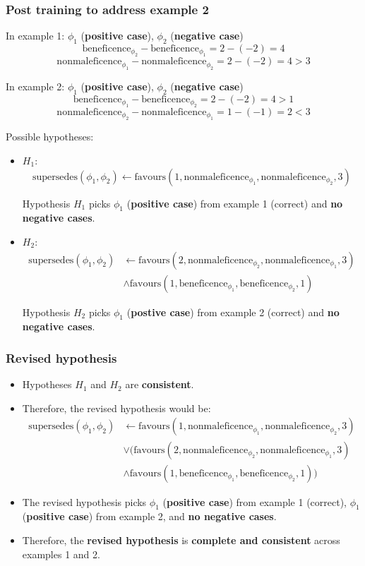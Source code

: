 \documentclass[11pt]{article}
\begin{document}
\subsubsection{Post training to address example 2}
\label{sec:orga0d6601}
In example 1:
\(\phi_1\) (\textbf{positive case}), \(\phi_2\) (\textbf{negative case})
\[\text{beneficence}_{\phi_2} - \text{beneficence}_{\phi_1} = 2 - (-2) = 4\]
\[\text{nonmaleficence}_{\phi_1} - \text{nonmaleficence}_{\phi_2} = 2 - (-2) = 4 > 3\]

In example 2:
\(\phi_1\) (\textbf{positive case}), \(\phi_2\) (\textbf{negative case})
\[\text{beneficence}_{\phi_1} - \text{beneficence}_{\phi_2} = 2 - (-2) = 4 > 1\]
\[\text{nonmaleficence}_{\phi_2} - \text{nonmaleficence}_{\phi_1} = 1 - (-1) = 2 < 3\]

Possible hypotheses:
\begin{itemize}
\item \(H_1\):
\[\text{supersedes}(\phi_1, \phi_2) \leftarrow \text{favours}(1, \text{nonmaleficence}_{\phi_1}, \text{nonmaleficence}_{\phi_2}, 3)\]

Hypothesis \(H_1\) picks \(\phi_1\) (\textbf{positive case}) from example 1 (correct) and \textbf{no negative cases}.
\item \(H_2\):
\begin{align*}
\text{supersedes}(\phi_1, \phi_2) &\leftarrow \text{favours}(2, \text{nonmaleficence}_{\phi_2}, \text{nonmaleficence}_{\phi_1}, 3) \\
&\wedge \text{favours}(1, \text{beneficence}_{\phi_1}, \text{beneficence}_{\phi_2}, 1)
\end{align*}

Hypothesis \(H_2\) picks \(\phi_1\) (\textbf{postive case}) from example 2 (correct) and \textbf{no negative cases}.
\end{itemize}
\subsubsection{Revised hypothesis}
\label{sec:orgbc67055}
\begin{itemize}
\item Hypotheses \(H_1\) and \(H_2\) are \textbf{consistent}.
\item Therefore, the revised hypothesis would be:
\begin{align*}
\text{supersedes}(\phi_1, \phi_2) &\leftarrow \text{favours}(1, \text{nonmaleficence}_{\phi_1}, \text{nonmaleficence}_{\phi_2}, 3) \\
&\vee (\text{favours}(2, \text{nonmaleficence}_{\phi_2}, \text{nonmaleficence}_{\phi_1}, 3) \\
&\wedge \text{favours}(1, \text{beneficence}_{\phi_1}, \text{beneficence}_{\phi_2}, 1))
\end{align*}
\item The revised hypothesis picks \(\phi_1\) (\textbf{positive case}) from example 1 (correct), \(\phi_1\) (\textbf{positive case}) from example 2, and \textbf{no negative cases}.
\item Therefore, the \textbf{revised hypothesis} is \textbf{complete and consistent} across examples 1 and 2.
\end{itemize}
\end{document}
